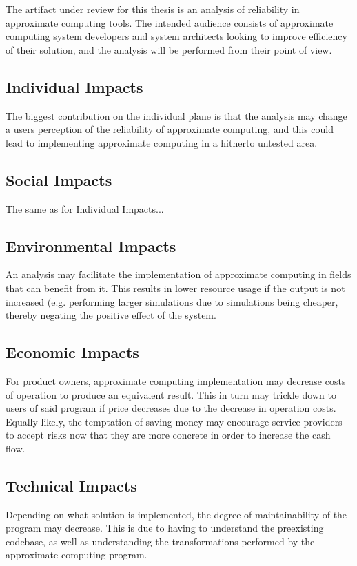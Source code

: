The artifact under review for this thesis is an analysis of reliability in approximate computing tools. The intended audience consists of approximate computing system developers and system architects looking to improve efficiency of their solution, and the analysis will be performed from their point of view. 

\subsection{Individual Impacts}
The biggest contribution on the individual plane is that the analysis may change a users perception of the reliability of approximate computing, and this could lead to implementing approximate computing in a hitherto untested area. 


\subsection{Social Impacts}
The same as for Individual Impacts...
\subsection{Environmental Impacts}
An analysis may facilitate the implementation of approximate computing in fields that can benefit from it. This results in lower resource usage if the output is not increased (e.g. performing larger simulations due to simulations being cheaper, thereby negating the positive effect of the system.

\subsection{Economic Impacts}
For product owners, approximate computing implementation may decrease costs of operation to produce an equivalent result. This in turn may trickle down to users of said program if price decreases due to the decrease in operation costs. 
Equally likely, the temptation of saving money may encourage service providers to accept risks now that they are more concrete in order to increase the cash flow.
\subsection{Technical Impacts}
Depending on what solution is implemented, the degree of maintainability of the program may decrease. This is due to having to understand the preexisting codebase, as well as understanding the transformations performed by the approximate computing program. 

